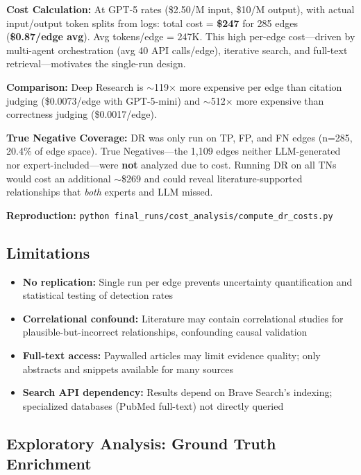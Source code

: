 \textbf{Cost Calculation:} At GPT-5 rates (\$2.50/M input, \$10/M output), with actual input/output token splits from logs: total cost = \textbf{\$247} for 285 edges (\textbf{\$0.87/edge avg}). Avg tokens/edge = 247K. This high per-edge cost---driven by multi-agent orchestration (avg 40 API calls/edge), iterative search, and full-text retrieval---motivates the single-run design.

\textbf{Comparison:} Deep Research is $\sim$119$\times$ more expensive per edge than citation judging (\$0.0073/edge with GPT-5-mini) and $\sim$512$\times$ more expensive than correctness judging (\$0.0017/edge).

\textbf{True Negative Coverage:} DR was only run on TP, FP, and FN edges (n=285, 20.4\% of edge space). True Negatives---the 1,109 edges neither LLM-generated nor expert-included---were \textbf{not} analyzed due to cost. Running DR on all TNs would cost an additional $\sim$\$269 and could reveal literature-supported relationships that \textit{both} experts and LLM missed.

\textbf{Reproduction:} \texttt{python final\_runs/cost\_analysis/compute\_dr\_costs.py}

\subsection{Limitations}

\begin{itemize}[noitemsep]
    \item \textbf{No replication:} Single run per edge prevents uncertainty quantification and statistical testing of detection rates
    \item \textbf{Correlational confound:} Literature may contain correlational studies for plausible-but-incorrect relationships, confounding causal validation
    \item \textbf{Full-text access:} Paywalled articles may limit evidence quality; only abstracts and snippets available for many sources
    \item \textbf{Search API dependency:} Results depend on Brave Search's indexing; specialized databases (PubMed full-text) not directly queried
\end{itemize}

\subsection{Exploratory Analysis: Ground Truth Enrichment}
\label{sec:gt_enrichment_method}


